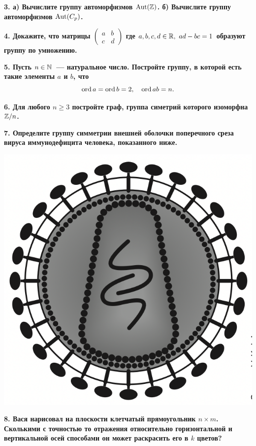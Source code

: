 \documentclass[12pt, oneside, dvipsnames]{extarticle}
\begin{document}
	\bf{3.} а) Вычислите группу автоморфизмов $\mathrm{\operatorname{Aut}}(\mathbb{Z})$. б) Вычислите группу автоморфизмов $\mathrm{\operatorname{Aut}}(C_{p})$. 

	\bf{4.} Докажите, что матрицы  $\begin{pmatrix} a & b \\ c & d \end{pmatrix}$ где $a, b, c, d \in \mathbb{R}, \ ad - bc = 1$ образуют группу по умножению. 

	\bf{5.} Пусть $n \in \mathbb{N}$~--- натуральное число. Постройте группу, в которой есть такие элементы $a$ и $b$, что 
	\[
		\operatorname{ord}{a} = \operatorname{ord}{b} =  2, \quad \operatorname{ord}{ab} = n.
	\]
	
	\bf{6.} Для любого $n \ge 3$ постройте граф, группа симетрий которого изоморфна $\mathbb{Z}/n$.

	\bf{7.} Определите группу симметрии внешней оболочки поперечного среза вируса иммунодефицита человека, показанного ниже.

	\begin{center}
		\includegraphics[scale = 0.3]{papers/print/pic/pic_3.png}
	\end{center}

	\bf{8.} Вася нарисовал на  плоскости  клетчатый прямоугольник $n \times m$. Сколькими  с точностью то отражения относительно горизонтальной и вертикальной осей способами он может раскрасить его в $k$ цветов?
\end{document}
